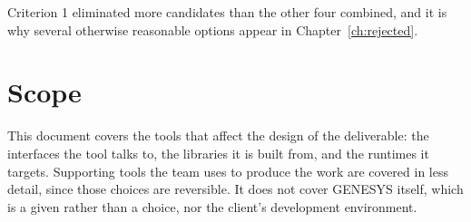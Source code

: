 Criterion 1 eliminated more candidates than the other four combined, and it is
why several otherwise reasonable options appear in Chapter~\ref{ch:rejected}.

\section{Scope}

This document covers the tools that affect the design of the deliverable: the
interfaces the tool talks to, the libraries it is built from, and the runtimes it
targets. Supporting tools the team uses to produce the work are covered in less
detail, since those choices are reversible. It does not cover GENESYS itself,
which is a given rather than a choice, nor the client's development environment.
